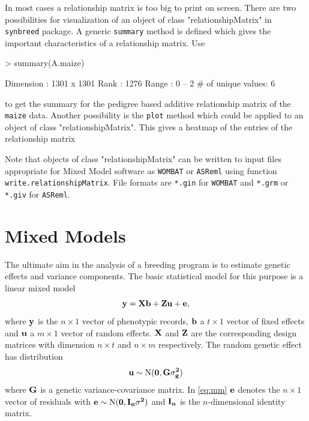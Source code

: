 \documentclass[a4paper,11pt]{article}
\begin{document}
In most cases a relationship matrix is too big to print on screen. There are two possibilities for visualization of an object of class "relationshipMatrix" in \texttt{synbreed} package. A generic \texttt{summary} method is defined which gives the important characteristics of a relationship matrix. Use
\begin{Schunk}
\begin{Sinput}
> summary(A.maize)
\end{Sinput}
\begin{Soutput}
Dimension         : 1301 x 1301 
Rank              : 1276 
Range             : 0 -- 2 
# of unique values: 6 
\end{Soutput}
\end{Schunk}
to get the summary for the pedigree based additive relationship matrix of the \texttt{maize} data. Another possibility is the \texttt{plot} method which could be applied
to an object of class "relationshipMatrix". This gives a heatmap of the entries of the relationship matrix

Note that objects of class "relationshipMatrix" can be written to input files appropriate for Mixed Model software as \texttt{WOMBAT} \citep{Meyer2006} or \texttt{ASReml} \citep{Gilmour2000} using function 
\texttt{write.relationshipMatrix}. File formats are \texttt{*.gin} for \texttt{WOMBAT} and \texttt{*.grm} or \texttt{*.giv} for \texttt{ASReml}.

\section{Mixed Models}\label{sec:Models}

The ultimate aim in the analysis of a breeding program is to estimate genetic effects and variance components. The basic statistical model for this purpose is a linear mixed model
\begin{equation}\label{eq:mm}
\bf y = \bf X \bf b + \bf Z \bf u + \bf e,
\end{equation}
where $\bf y$ is the $n \times 1$ vector of phenotypic records, $\bf b$ a $t \times 1$ vector of fixed effects and $\bf u$ a  $m \times 1$ vector of random effects. $\bf X$ and $\bf Z$ are the corresponding design matrices with dimension $n \times t$  and $n \times m$ respectively. The random genetic effect has distribution
$$ \bf u \sim \text{N}( \bf 0, \bf G \sigma^2_g)$$
where $\bf G$ is a genetic variance-covariance matrix. In \eqref{eq:mm} $\bf e$ denotes the $n \times 1$ vector of residuals with $ \bf e \sim \text{N}( \bf 0, \bf I_n \sigma^2)$ and $\bf I_n$ is the $n$-dimensional identity matrix.
                                                                                                                                                    
\end{document}
